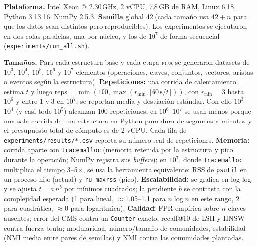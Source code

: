 \textbf{Plataforma.} Intel Xeon @ 2.30\,GHz, 2 vCPU, 7.8\,GB de RAM, Linux 6.18, Python 3.13.16, NumPy 2.5.3. \textbf{Semilla} global 42 (cada
tamaño usa $42+n$ para que los datos sean distintos pero reproducibles). Los experimentos se ejecutaron en dos colas paralelas, una por núcleo, y los de
$10^7$ de forma secuencial (\texttt{experiments/run\_all.sh}).

\textbf{Tamaños.} Para cada estructura base y cada etapa \textsc{fija} se generaron datasets de $10^3$, $10^4$, $10^5$, $10^6$ y $10^7$ elementos (operaciones,
claves, conjuntos, vectores, aristas o eventos según la estructura). \textbf{Repeticiones:} una corrida de calentamiento estima $t$ y luego
$\text{reps}=\min(100,\max(r_{\min},\lfloor 60\,\mathrm{s}/t\rfloor))$, con $r_{\min}=3$ hasta $10^6$ y entre 1 y 3 en $10^7$; se reportan media y desviación
estándar. Con ello $10^3$–$10^4$ (y casi todo $10^5$) alcanzan 100 repeticiones; en $10^6$–$10^7$ se usan menos porque una sola corrida de una estructura en
Python puro dura de segundos a minutos y el presupuesto total de cómputo es de 2 vCPU. Cada fila de \texttt{experiments/results/*.csv} reporta su número real de
repeticiones. \textbf{Memoria:} corrida aparte con \texttt{tracemalloc} (memoria retenida por la estructura y pico durante la operación; NumPy registra sus
\emph{buffers}); en $10^7$, donde \texttt{tracemalloc} multiplica el tiempo 3–5$\times$, se usa la herramienta equivalente: RSS de \texttt{psutil} en un proceso hijo
(actual) y \texttt{ru\_maxrss} (pico). \textbf{Escalabilidad:} se grafica en log-log y se ajusta $t=a\,n^{b}$ por mínimos cuadrados; la pendiente $b$ se contrasta
con la complejidad esperada (1 para lineal, $\approx$1.05–1.1 para $n\log n$ en este rango, 2 para cuadrática, $\approx$0 para logarítmica).
\textbf{Calidad:} FPR empírica sobre $n$ claves ausentes; error del CMS contra un \texttt{Counter} exacto; recall@10 de LSH y HNSW contra fuerza bruta;
modularidad, número/tamaño de comunidades, estabilidad (NMI media entre pares de semillas) y NMI contra las comunidades plantadas.
